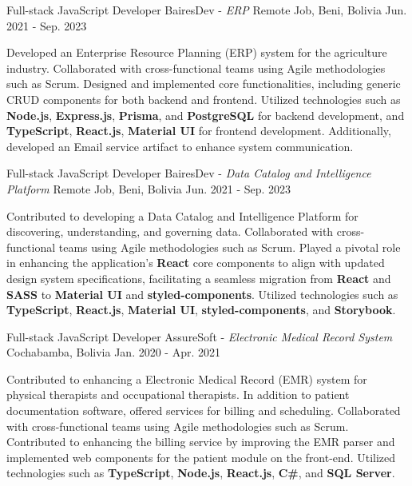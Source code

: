 \begin{cventries}
\cventry
    {Full-stack JavaScript Developer}
    {BairesDev - \textit{ERP}}
    {Remote Job, Beni, Bolivia}
    {Jun. 2021 - Sep. 2023}
    {
      \begin{cvitems} 
        { Developed an Enterprise Resource Planning (ERP) system for the agriculture industry. Collaborated with cross-functional teams using Agile methodologies such as Scrum. Designed and implemented core functionalities, including generic CRUD components for both backend and frontend. Utilized technologies such as \textbf{Node.js}, \textbf{Express.js}, \textbf{Prisma}, and \textbf{PostgreSQL} for backend development, and \textbf{TypeScript}, \textbf{React.js}, \textbf{Material UI} for frontend development. Additionally, developed an Email service artifact to enhance system communication.}
      \end{cvitems} 
    }
\cventry
    {Full-stack JavaScript Developer}
    {BairesDev - \textit{Data Catalog and Intelligence Platform}}
    {Remote Job, Beni, Bolivia}
    {Jun. 2021 - Sep. 2023}
    {
      \begin{cvitems} 
        { Contributed to developing a Data Catalog and Intelligence Platform for discovering, understanding, and governing data. Collaborated with cross-functional teams using Agile methodologies such as Scrum. Played a pivotal role in enhancing the application’s \textbf{React} core components to align with updated design system specifications, facilitating a seamless migration from \textbf{React} and \textbf{SASS} to \textbf{Material UI} and \textbf{styled-components}. Utilized technologies such as \textbf{TypeScript}, \textbf{React.js}, \textbf{Material UI}, \textbf{styled-components}, and \textbf{Storybook}.}
      \end{cvitems} 
    }
\cventry
    {Full-stack JavaScript Developer}
    {AssureSoft - \textit{Electronic Medical Record System}}
    {Cochabamba, Bolivia}
    {Jan. 2020 - Apr. 2021}
    {
      \begin{cvitems}
        {Contributed to enhancing a Electronic Medical Record (EMR) system for physical therapists and occupational therapists. In addition to patient documentation software, offered services for billing and scheduling. Collaborated with cross-functional teams using Agile methodologies such as Scrum. Contributed to enhancing the billing service by improving the EMR parser and implemented web components for the patient module on the front-end. Utilized technologies such as \textbf{TypeScript}, \textbf{Node.js}, \textbf{React.js}, \textbf{C\#}, and \textbf{SQL Server}.}

\end{cvitems}}
\end{cventries}
